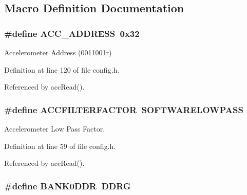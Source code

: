 \subsection{Macro Definition Documentation}
\hypertarget{group__config_ga27341a8e1cb1a6ace5a5cf3caea1c99f}{
\subsubsection[{A\-C\-C\-\_\-\-A\-D\-D\-R\-E\-S\-S}]{\setlength{\rightskip}{0pt plus 5cm}\#define A\-C\-C\-\_\-\-A\-D\-D\-R\-E\-S\-S~0x32}}\label{group__config_ga27341a8e1cb1a6ace5a5cf3caea1c99f}


Accelerometer Address (0011001r) 



Definition at line 120 of file config.\-h.



Referenced by acc\-Read().

\hypertarget{group__config_gaace41596724b03f3f2b2ee28b7e87272}{
\subsubsection[{A\-C\-C\-F\-I\-L\-T\-E\-R\-F\-A\-C\-T\-O\-R}]{\setlength{\rightskip}{0pt plus 5cm}\#define A\-C\-C\-F\-I\-L\-T\-E\-R\-F\-A\-C\-T\-O\-R~{\bf S\-O\-F\-T\-W\-A\-R\-E\-L\-O\-W\-P\-A\-S\-S}}}\label{group__config_gaace41596724b03f3f2b2ee28b7e87272}


Accelerometer Low Pass Factor. 



Definition at line 59 of file config.\-h.



Referenced by acc\-Read().

\hypertarget{group__config_gafba0bbf9336cfc754622a5e9b3d12d80}{
\subsubsection[{B\-A\-N\-K0\-D\-D\-R}]{\setlength{\rightskip}{0pt plus 5cm}\#define B\-A\-N\-K0\-D\-D\-R~D\-D\-R\-G}}\label{group__config_gafba0bbf9336cfc754622a5e9b3d12d80}



